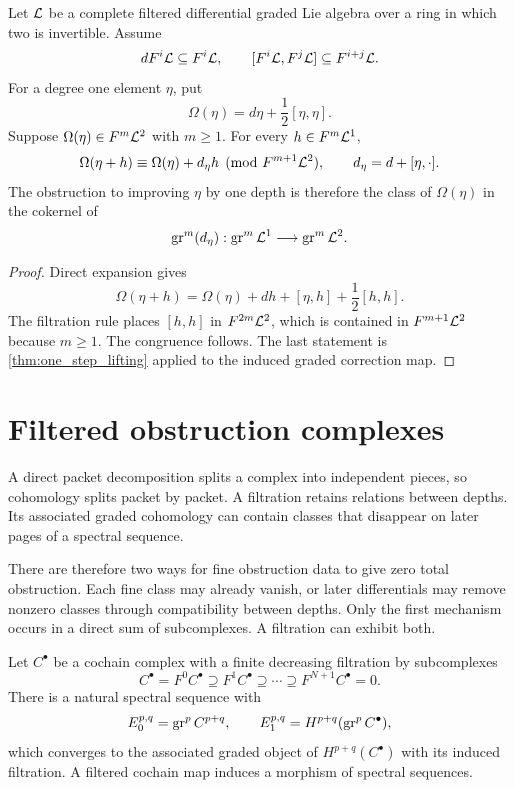 \begin{proposition}\label{prop:maurer_cartan_lifting}
Let $\mathcal L$ be a complete filtered differential graded Lie algebra over a ring in which two is invertible.  Assume
\[
dF^i\mathcal L\subseteq F^i\mathcal L,
\qquad
[F^i\mathcal L,F^j\mathcal L]\subseteq F^{i+j}\mathcal L.
\]
For a degree one element $\eta$, put
\[
\Omega(\eta)=d\eta+\frac12[\eta,\eta].
\]
Suppose $\Omega(\eta)\in F^m\mathcal L^2$ with $m\ge1$.  For every $h\in F^m\mathcal L^1$,
\[
\Omega(\eta+h)
\equiv
\Omega(\eta)+d_\eta h
\pmod{F^{m+1}\mathcal L^2},
\qquad
d_\eta=d+[\eta,\mathord\cdot].
\]
The obstruction to improving $\eta$ by one depth is therefore the class of $\Omega(\eta)$ in the cokernel of
\[
\operatorname{gr}^m(d_\eta):
\operatorname{gr}^m\mathcal L^1
\longrightarrow
\operatorname{gr}^m\mathcal L^2.
\]
\end{proposition}

\begin{proof}
Direct expansion gives
\[
\Omega(\eta+h)
=
\Omega(\eta)+dh+[\eta,h]+\frac12[h,h].
\]
The filtration rule places $[h,h]$ in $F^{2m}\mathcal L^2$, which is contained in $F^{m+1}\mathcal L^2$ because $m\ge1$.  The congruence follows.  The last statement is \cref{thm:one_step_lifting} applied to the induced graded correction map.
\end{proof}

\section{Filtered obstruction complexes}\label{sec:obstruction_spectral_sequence}

A direct packet decomposition splits a complex into independent pieces, so cohomology splits packet by packet. A filtration retains relations between depths. Its associated graded cohomology can contain classes that disappear on later pages of a spectral sequence.

There are therefore two ways for fine obstruction data to give zero total obstruction. Each fine class may already vanish, or later differentials may remove nonzero classes through compatibility between depths. Only the first mechanism occurs in a direct sum of subcomplexes. A filtration can exhibit both.

\begin{standardfact}\label{fact:filtered_spectral_sequence}
Let $C^\bullet$ be a cochain complex with a finite decreasing filtration by subcomplexes
\[
C^\bullet=F^0C^\bullet\supseteq F^1C^\bullet\supseteq\cdots\supseteq F^{N+1}C^\bullet=0.
\]
There is a natural spectral sequence with
\[
E_0^{p,q}=\operatorname{gr}^pC^{p+q},
\qquad
E_1^{p,q}=H^{p+q}(\operatorname{gr}^pC^\bullet),
\]
which converges to the associated graded object of $H^{p+q}(C^\bullet)$ with its induced filtration.  A filtered cochain map induces a morphism of spectral sequences.
\end{standardfact}

